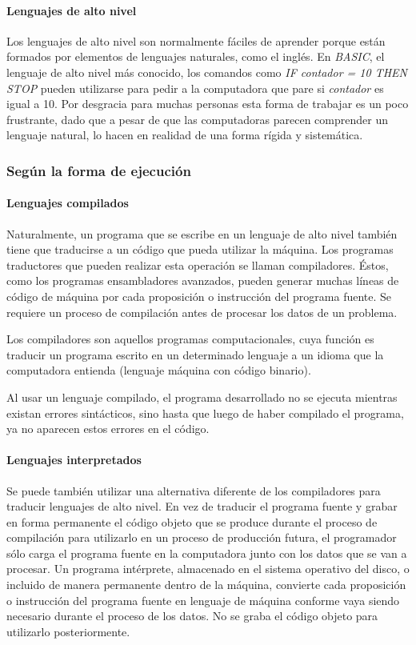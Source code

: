 \documentclass[12pt,legalpaper]{report}
\begin{document}
				\paragraph{Lenguajes de alto nivel}

Los lenguajes de alto nivel son normalmente fáciles de aprender porque están formados por elementos de lenguajes naturales, como el inglés. En \textit{BASIC}, el lenguaje de alto nivel más conocido, los comandos como \textit{IF contador = 10 THEN STOP} pueden utilizarse para pedir a la computadora que pare si \textit{contador} es igual a 10. Por desgracia para muchas personas esta forma de trabajar es un poco frustrante, dado que a pesar de que las computadoras parecen comprender un lenguaje natural, lo hacen en realidad de una forma rígida y sistemática.


			\subsubsection{Según la forma de ejecución}

				\paragraph{Lenguajes compilados}

Naturalmente, un programa que se escribe en un lenguaje de alto nivel también tiene que traducirse a un código que pueda utilizar la máquina. Los programas traductores que pueden realizar esta operación se llaman compiladores. Éstos, como los programas ensambladores avanzados, pueden generar muchas líneas de código de máquina por cada proposición o instrucción del programa fuente. Se requiere un proceso de compilación antes de procesar los datos de un problema.

Los compiladores son aquellos programas computacionales, cuya función es traducir un programa escrito en un determinado lenguaje a un idioma que la computadora entienda (lenguaje máquina con código binario).

Al usar un lenguaje compilado, el programa desarrollado no se ejecuta mientras existan errores sintácticos, sino hasta que luego de haber compilado el programa, ya no aparecen estos errores en el código.

				\paragraph{Lenguajes interpretados}

Se puede también utilizar una alternativa diferente de los compiladores para traducir lenguajes de alto nivel. En vez de traducir el programa fuente y grabar en forma permanente el código objeto que se produce durante el proceso de compilación para utilizarlo en un proceso de producción futura, el programador sólo carga el programa fuente en la computadora junto con los datos que se van a procesar. Un programa intérprete, almacenado en el sistema operativo del disco, o incluido de manera permanente dentro de la máquina, convierte cada proposición o instrucción del programa fuente en lenguaje de máquina conforme vaya siendo necesario durante el proceso de los datos. No se graba el código objeto para utilizarlo posteriormente.
\end{document}
